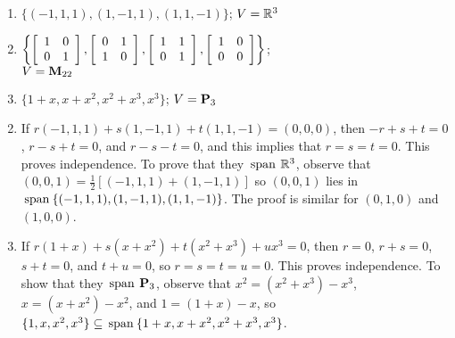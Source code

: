 \begin{multicols}{2}
\begin{ex}
\begin{enumerate}[label={\alph*.}]
\item $\{(-1, 1, 1), (1, -1, 1), (1, 1, -1)\}$; $V = \mathbb{R}^3$

\item $\left\{
\left[ \begin{array}{rr}
1 & 0 \\
0 & 1
\end{array} \right]
, 
\left[ \begin{array}{rr}
0 & 1 \\
1 & 0
\end{array} \right]
, 
\left[ \begin{array}{rr}
1 & 1 \\
0 & 1
\end{array} \right]
, 
\left[ \begin{array}{rr}
1 & 0 \\
0 & 0
\end{array} \right]
\right\}$; \\ $V = \textbf{M}_{22}$

\item $\{1 + x, x + x^{2}, x^{2} + x^{3}, x^{3}\}$; $V = \textbf{P}_{3}$

\end{enumerate}
\begin{sol}
\begin{enumerate}[label={\alph*.}]
\setcounter{enumi}{1}
\item  If $r(-1, 1, 1) + s(1, -1, 1) + t(1, 1, -1) = (0, 0, 0)$, then $-r + s + t = 0$, $r - s + t = 0$, and $r - s - t = 0$, and this implies that $r = s = t = 0$. This proves independence. To prove that they $\thinspace\operatorname{span\medspace} \mathbb{R}^3$, observe that $(0, 0, 1) = \frac{1}{2}[(-1, 1, 1) + (1, -1, 1)]$ so $(0, 0, 1)$ lies in $\thinspace\operatorname{span\medspace}\{(-1, 1, 1), (1, -1, 1), (1, 1, -1)\}$. The proof is similar for $(0, 1, 0)$ and $(1, 0, 0)$.

\setcounter{enumi}{3}
\item  If $r(1 + x) + s(x + x^{2}) + t(x^{2} + x^{3}) + ux^{3} = 0$, then $r = 0$, $r + s = 0$, $s + t = 0$, and $t + u = 0$, so $r = s = t = u = 0$. This proves independence. To show that they $\thinspace\operatorname{span\medspace} \textbf{P}_{3}$, observe that $x^{2} = (x^{2} + x^{3}) - x^{3}$, $x = (x + x^{2}) - x^{2}$, and $1 = (1 + x) - x$, so $\{1, x, x^{2}, x^{3}\} \subseteq \thinspace\operatorname{span\medspace}\{1 + x, x + x^{2}, x^{2} + x^{3}, x^{3}\}$.

\end{enumerate}
\end{sol}
\end{ex}


\end{multicols}
